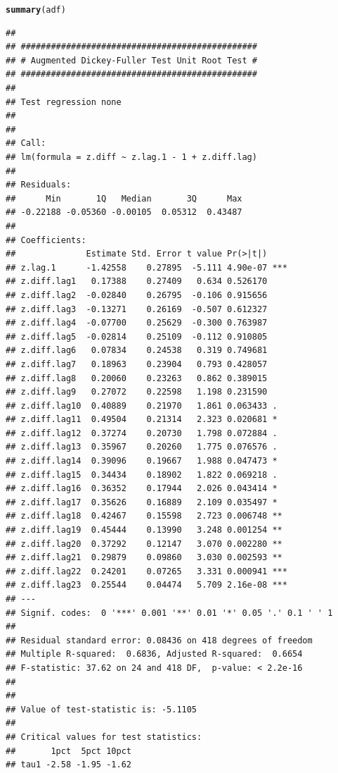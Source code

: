 \documentclass{article}\usepackage[]{graphicx}\usepackage[]{color}
\makeatletter
\newcommand{\hlstd}[1]{\textcolor[rgb]{0.345,0.345,0.345}{#1}}%
\newcommand{\hlkwd}[1]{\textcolor[rgb]{0.737,0.353,0.396}{\textbf{#1}}}%
\newenvironment{kframe}{%
 \def\at@end@of@kframe{}%
 \ifinner\ifhmode%
  \def\at@end@of@kframe{\end{minipage}}%
  \begin{minipage}{\columnwidth}%
 \fi\fi%
 \def\FrameCommand##1{\hskip\@totalleftmargin \hskip-\fboxsep
 \colorbox{shadecolor}{##1}\hskip-\fboxsep
     \hskip-\linewidth \hskip-\@totalleftmargin \hskip\columnwidth}%
 \MakeFramed {\advance\hsize-\width
   \@totalleftmargin\z@ \linewidth\hsize
   \@setminipage}}%
 {\par\unskip\endMakeFramed%
 \at@end@of@kframe}
\newenvironment{knitrout}{}{} %
\makeatother
\begin{document}
\begin{knitrout}
\color{fgcolor}\begin{kframe}
\begin{alltt}
\hlkwd{summary}\hlstd{(adf)}
\end{alltt}
\begin{verbatim}
## 
## ############################################### 
## # Augmented Dickey-Fuller Test Unit Root Test # 
## ############################################### 
## 
## Test regression none 
## 
## 
## Call:
## lm(formula = z.diff ~ z.lag.1 - 1 + z.diff.lag)
## 
## Residuals:
##      Min       1Q   Median       3Q      Max 
## -0.22188 -0.05360 -0.00105  0.05312  0.43487 
## 
## Coefficients:
##              Estimate Std. Error t value Pr(>|t|)    
## z.lag.1      -1.42558    0.27895  -5.111 4.90e-07 ***
## z.diff.lag1   0.17388    0.27409   0.634 0.526170    
## z.diff.lag2  -0.02840    0.26795  -0.106 0.915656    
## z.diff.lag3  -0.13271    0.26169  -0.507 0.612327    
## z.diff.lag4  -0.07700    0.25629  -0.300 0.763987    
## z.diff.lag5  -0.02814    0.25109  -0.112 0.910805    
## z.diff.lag6   0.07834    0.24538   0.319 0.749681    
## z.diff.lag7   0.18963    0.23904   0.793 0.428057    
## z.diff.lag8   0.20060    0.23263   0.862 0.389015    
## z.diff.lag9   0.27072    0.22598   1.198 0.231590    
## z.diff.lag10  0.40889    0.21970   1.861 0.063433 .  
## z.diff.lag11  0.49504    0.21314   2.323 0.020681 *  
## z.diff.lag12  0.37274    0.20730   1.798 0.072884 .  
## z.diff.lag13  0.35967    0.20260   1.775 0.076576 .  
## z.diff.lag14  0.39096    0.19667   1.988 0.047473 *  
## z.diff.lag15  0.34434    0.18902   1.822 0.069218 .  
## z.diff.lag16  0.36352    0.17944   2.026 0.043414 *  
## z.diff.lag17  0.35626    0.16889   2.109 0.035497 *  
## z.diff.lag18  0.42467    0.15598   2.723 0.006748 ** 
## z.diff.lag19  0.45444    0.13990   3.248 0.001254 ** 
## z.diff.lag20  0.37292    0.12147   3.070 0.002280 ** 
## z.diff.lag21  0.29879    0.09860   3.030 0.002593 ** 
## z.diff.lag22  0.24201    0.07265   3.331 0.000941 ***
## z.diff.lag23  0.25544    0.04474   5.709 2.16e-08 ***
## ---
## Signif. codes:  0 '***' 0.001 '**' 0.01 '*' 0.05 '.' 0.1 ' ' 1
## 
## Residual standard error: 0.08436 on 418 degrees of freedom
## Multiple R-squared:  0.6836,	Adjusted R-squared:  0.6654 
## F-statistic: 37.62 on 24 and 418 DF,  p-value: < 2.2e-16
## 
## 
## Value of test-statistic is: -5.1105 
## 
## Critical values for test statistics: 
##       1pct  5pct 10pct
## tau1 -2.58 -1.95 -1.62
\end{verbatim}
\end{kframe}
\end{knitrout}
\end{document}
